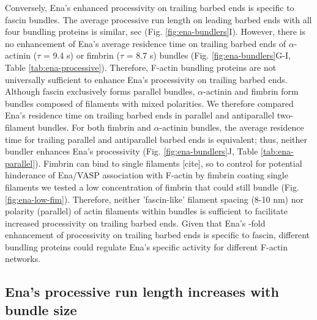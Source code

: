 Conversely, Ena's enhanced processivity on trailing barbed ends is specific to fascin bundles. The average processive run length on leading barbed ends with all four bundling proteins is similar,  sec (Fig. \ref{fig:ena-bundlers}I). However, there is no enhancement of Ena's average residence time on trailing barbed ends of $\alpha$-actinin ($\tau$ = 9.4 s) or fimbrin ($\tau$ = 8.7 s) bundles (Fig. \ref{fig:ena-bundlers}G-I, Table \ref{tab:ena-processive}). Therefore, F-actin bundling proteins are not universally sufficient to enhance Ena's processivity on trailing barbed ends. Although fascin exclusively forms parallel bundles, $\alpha$-actinin and fimbrin form bundles composed of filaments with mixed polarities. We therefore compared Ena's residence time on trailing barbed ends in parallel and antiparallel two-filament bundles. For both fimbrin and $\alpha$-actinin bundles, the average residence time for trailing parallel and antiparallel barbed ends is equivalent; thus, neither bundler enhances Ena's processivity (Fig. \ref{fig:ena-bundlers}J, Table \ref{tab:ena-parallel}). Fimbrin can bind to single filaments [cite], so to control for potential hinderance of Ena/VASP association with F-actin by fimbrin coating single filaments we tested a low concentration of fimbrin that could still bundle (Fig. \ref{fig:ena-low-fim}). Therefore, neither 'fascin-like' filament spacing (8-10 nm) nor polarity (parallel) of actin filaments within bundles is sufficient to facilitate increased processivity on trailing barbed ends. Given that Ena's -fold enhancement of processivity on trailing barbed ends is specific to fascin, different bundling proteins could regulate Ena's specific activity for different F-actin networks. 

\subsection{Ena's processive run length increases with bundle size}\label{ena-bundle-size}

